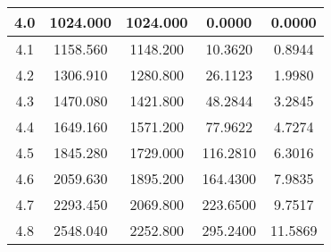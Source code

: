 \begin{table}[h!]
\begin{tabular}{|c|c|c|c|c|}
        4.0        & 1024.000       & 1024.000                           & 0.0000        & 0.0000                \\ \hline
        4.1        & 1158.560       & 1148.200                           & 10.3620       & 0.8944                \\ \hline
        4.2        & 1306.910       & 1280.800                           & 26.1123       & 1.9980                \\ \hline
        4.3        & 1470.080       & 1421.800                           & 48.2844       & 3.2845                \\ \hline
        4.4        & 1649.160       & 1571.200                           & 77.9622       & 4.7274                \\ \hline
        4.5        & 1845.280       & 1729.000                           & 116.2810      & 6.3016                \\ \hline
        4.6        & 2059.630       & 1895.200                           & 164.4300      & 7.9835                \\ \hline
        4.7        & 2293.450       & 2069.800                           & 223.6500      & 9.7517                \\ \hline
        4.8        & 2548.040       & 2252.800                           & 295.2400      & 11.5869               \\ \hline
    \end{tabular}\label{tab:table5}
\end{table}
